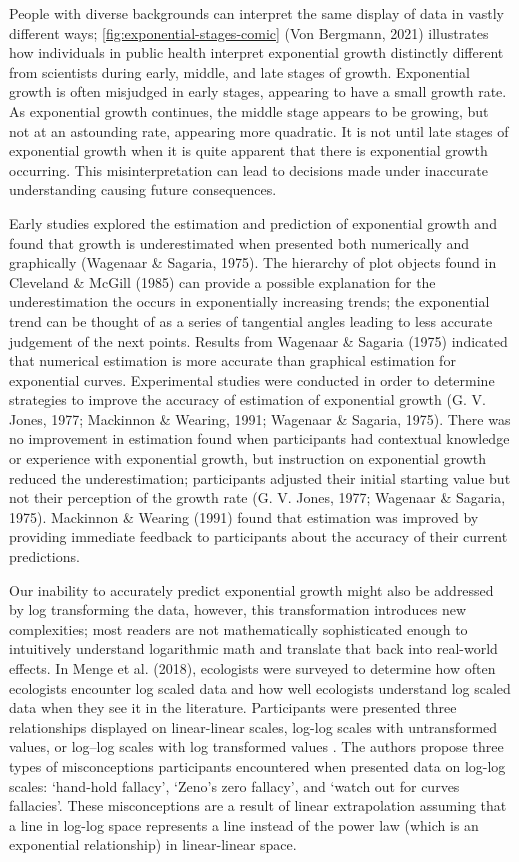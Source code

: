 \documentclass[print]{nuthesis}
\begin{document}
People with diverse backgrounds can interpret the same display of data in vastly different ways; \cref{fig:exponential-stages-comic} (Von Bergmann, 2021) illustrates how individuals in public health interpret exponential growth distinctly different from scientists during early, middle, and late stages of growth.
Exponential growth is often misjudged in early stages, appearing to have a small growth rate.
As exponential growth continues, the middle stage appears to be growing, but not at an astounding rate, appearing more quadratic.
It is not until late stages of exponential growth when it is quite apparent that there is exponential growth occurring.
This misinterpretation can lead to decisions made under inaccurate understanding causing future consequences.

Early studies explored the estimation and prediction of exponential growth and found that growth is underestimated when presented both numerically and graphically (Wagenaar \& Sagaria, 1975).
The hierarchy of plot objects found in Cleveland \& McGill (1985) can provide a possible explanation for the underestimation the occurs in exponentially increasing trends; the exponential trend can be thought of as a series of tangential angles leading to less accurate judgement of the next points.
Results from Wagenaar \& Sagaria (1975) indicated that numerical estimation is more accurate than graphical estimation for exponential curves.
Experimental studies were conducted in order to determine strategies to improve the accuracy of estimation of exponential growth (G. V. Jones, 1977; Mackinnon \& Wearing, 1991; Wagenaar \& Sagaria, 1975).
There was no improvement in estimation found when participants had contextual knowledge or experience with exponential growth, but instruction on exponential growth reduced the underestimation; participants adjusted their initial starting value but not their perception of the growth rate (G. V. Jones, 1977; Wagenaar \& Sagaria, 1975).
Mackinnon \& Wearing (1991) found that estimation was improved by providing immediate feedback to participants about the accuracy of their current predictions.

Our inability to accurately predict exponential growth might also be addressed by log transforming the data, however, this transformation introduces new complexities; most readers are not mathematically sophisticated enough to intuitively understand logarithmic math and translate that back into real-world effects.
In Menge et al. (2018), ecologists were surveyed to determine how often ecologists encounter log scaled data and how well ecologists understand log scaled data when they see it in the literature.
Participants were presented three relationships displayed on linear-linear scales, log-log scales with untransformed values, or log--log scales with log transformed values .
The authors propose three types of misconceptions participants encountered when presented data on log-log scales: `hand-hold fallacy', `Zeno's zero fallacy', and `watch out for curves fallacies'.
These misconceptions are a result of linear extrapolation assuming that a line in log-log space represents a line instead of the power law (which is an exponential relationship) in linear-linear space.
\end{document}

